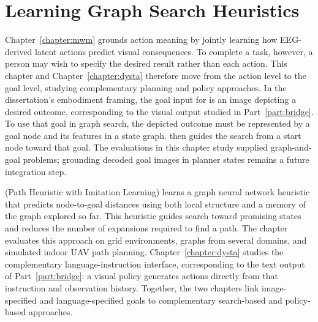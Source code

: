 \chapter{Learning Graph Search Heuristics}
\label{chapter:phil}

Chapter~\ref{chapter:mwm} grounds action meaning by jointly learning how EEG-derived latent actions predict visual consequences. To complete a task, however, a person may wish to specify the desired result rather than each action. This chapter and Chapter~\ref{chapter:dysta} therefore move from the action level to the goal level, studying complementary planning and policy approaches. In the dissertation's embodiment framing, the goal input for \phil{} is an image depicting a desired outcome, corresponding to the visual output studied in Part~\ref{part:bridge}. To use that goal in graph search, the depicted outcome must be represented by a goal node and its features in a state graph. \phil{} then guides the search from a start node toward that goal. The evaluations in this chapter study supplied graph-and-goal problems; grounding decoded goal images in planner states remains a future integration step.

\phil{} (Path Heuristic with Imitation Learning) learns a graph neural network heuristic that predicts node-to-goal distances using both local structure and a memory of the graph explored so far. This heuristic guides search toward promising states and reduces the number of expansions required to find a path. The chapter evaluates this approach on grid environments, graphs from several domains, and simulated indoor UAV path planning. Chapter~\ref{chapter:dysta} studies the complementary language-instruction interface, corresponding to the text output of Part~\ref{part:bridge}: a visual policy generates actions directly from that instruction and observation history. Together, the two chapters link image-specified and language-specified goals to complementary search-based and policy-based approaches.






